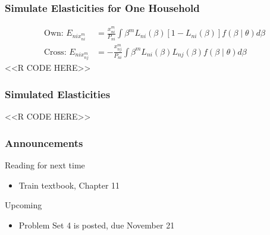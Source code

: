 \documentclass{beamer}
\begin{document}
\begin{frame}[fragile]\frametitle{Simulate Elasticities for One Household}
	\begin{align*}
    	\text{Own: } E_{nix_{ni}^m} &= \frac{x_{ni}^m}{P_{ni}} \int \beta^m L_{ni}(\beta) [1 - L_{ni}(\beta)] f(\beta \mid \theta) d \beta \\
    	\text{Cross: } E_{nix_{nj}^m} &= - \frac{x_{nj}^m}{P_{ni}} \int \beta^m L_{ni}(\beta) L_{nj}(\beta) f(\beta \mid \theta) d \beta
    \end{align*}
    \vspace{1ex}
    <<R CODE HERE>>
\end{frame}

\begin{frame}[fragile]\frametitle{Simulated Elasticities}
    <<R CODE HERE>>
\end{frame}

\begin{frame}\frametitle{Announcements}
    Reading for next time
    \begin{itemize}
        \item Train textbook, Chapter 11
    \end{itemize}
    \vspace{3ex}
    Upcoming
    \begin{itemize}
        \item Problem Set 4 is posted, due November 21
    \end{itemize}
\end{frame}
\end{document}
